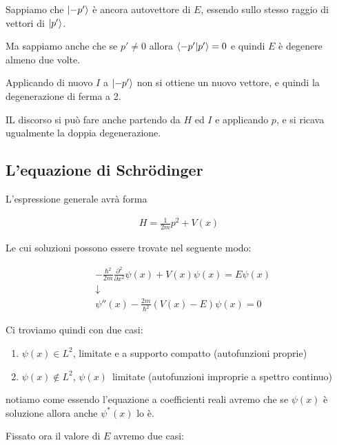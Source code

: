 Sappiamo che $\ket{-p'}$ è ancora autovettore di $E$, essendo sullo stesso raggio di vettori di $\ket{p'}$.

Ma sappiamo anche che se $p'\neq 0$ allora $\braket{-p'|p'}=0$ e quindi $E$ è degenere almeno due volte. 

Applicando di nuovo $I$ a $\ket{-p'}$ non si ottiene un nuovo vettore, e quindi la degenerazione di ferma a 2.

IL discorso si può fare anche partendo da $H$ ed $I$ e applicando $p$, e si ricava ugualmente la doppia degenerazione.

\newpage

\subsection{L'equazione di Schrödinger}

L'espressione generale avrà forma

\begin{align}
H= \frac{1}{2m} p^2 + V(x)
\end{align}

Le cui soluzioni possono essere trovate nel seguente modo:

\begin{align}
{}&-\frac{\hbar^2}{2m} \frac{\partial^2}{\partial x^2}\psi(x) + V(x)\psi(x) = E\psi(x) \\
&\downarrow \nonumber \\
& \psi''(x) -\frac{2m}{\hbar^2} (V(x)-E)\psi(x)=0
\end{align}

Ci troviamo quindi con due casi:

\begin{enumerate}
	\item $\psi(x)\in L^2$, limitate e a supporto compatto (autofunzioni proprie)
	\item $\psi(x)\notin L^2$, $\psi(x) \,$ limitate (autofunzioni improprie a spettro continuo)
\end{enumerate}

notiamo come essendo l'equazione a coefficienti reali avremo che se $\psi(x)$ è soluzione allora anche $\psi^*(x)$ lo è.

Fissato ora il valore di $E$ avremo due casi:

